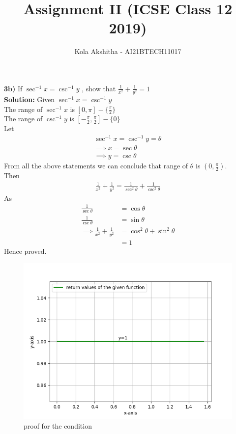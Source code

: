 \documentclass[journal,12pt,twocolumn]{IEEEtran}
\title{Assignment II (ICSE Class 12 2019)}
\author{Kola Akshitha - AI21BTECH11017}
\begin{document}
\maketitle
\textbf{3b)} 
If $\sec^{-1}x = \csc^{-1}y$ , show that $\frac{1}{x^{2}}+\frac{1}{y^{2}} = 1$
\\
\textbf{Solution:}
 Given $\sec^{-1}x = \csc^{-1}y$\\
 The range of $\sec^{-1}x$ is $[0,\pi]-\lbrace\frac{\pi}{2}\rbrace$ \\
 The range of $\csc^{-1}y$ is $[-\frac{\pi}{2},\frac{\pi}{2}]-\lbrace0\rbrace$ \\
 Let  
\begin{align} 
 \sec^{-1}x = \csc^{-1}y = \theta \nonumber
 \\
\implies x = \sec\theta 
 \\
\implies y = \csc\theta 
 \end{align}
 From all the above statements we can conclude that range of $\theta$ is $\left(0,\frac{\pi}{2}\right).$ \\
 Then
 \begin{align}
 \frac{1}{x^{2}}+\frac{1}{y^{2}} = \frac{1}{\sec^{2}\theta}+\frac{1}{\csc^{2}\theta}
 \end{align}
 As
 \begin{align}
  \frac{1}{\sec\theta}&=\cos\theta \nonumber
  \\
   \frac{1}{\csc\theta}&=\sin\theta \nonumber
 \\
\implies \frac{1}{x^{2}}+\frac{1}{y^{2}}&=\cos^{2}\theta+\sin^{2}\theta
\\
&=1 \nonumber
 \end{align}
 Hence proved.
\begin{figure}[!ht]
 \centering
 \includegraphics[width=\columnwidth]{code/Figure_2.png}
 \caption{proof for the condition}
 \label{fig-1}
 \end{figure}
 
 
\end{document}
